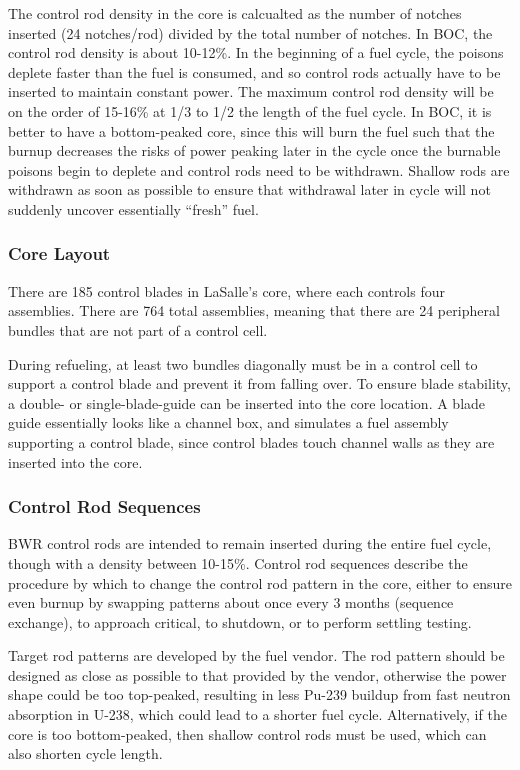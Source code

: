 \documentclass[10pt]{article}
\begin{document}
The control rod density in the core is calcualted as the number of notches inserted (24 notches/rod) divided by the total number of notches. In BOC, the control rod density is about 10-12\%. In the beginning of a fuel cycle, the poisons deplete faster than the fuel is consumed, and so control rods actually have to be inserted to maintain constant power. The maximum control rod density will be on the order of 15-16\% at 1/3 to 1/2 the length of the fuel cycle. In BOC, it is better to have a bottom-peaked core, since this will burn the fuel such that the burnup decreases the risks of power peaking later in the cycle once the burnable poisons begin to deplete and control rods need to be withdrawn. Shallow rods are withdrawn as soon as possible to ensure that withdrawal later in cycle will not suddenly uncover essentially “fresh” fuel. 

\subsubsection{Core Layout}

There are 185 control blades in LaSalle’s core, where each controls four assemblies. There are 764 total assemblies, meaning that there are 24 peripheral bundles that are not part of a control cell.

During refueling, at least two bundles diagonally must be in a control cell to support a control blade and prevent it from falling over. To ensure blade stability, a double- or single-blade-guide can be inserted into the core location. A blade guide essentially looks like a channel box, and simulates a fuel assembly supporting a control blade, since control blades touch channel walls as they are inserted into the core.

\subsubsection{Control Rod Sequences}

BWR control rods are intended to remain inserted during the entire fuel cycle, though with a density between 10-15\%. Control rod sequences describe the procedure by which to change the control rod pattern in the core, either to ensure even burnup by swapping patterns about once every 3 months (sequence exchange), to approach critical, to shutdown, or to perform settling testing. 

Target rod patterns are developed by the fuel vendor. The rod pattern should be designed as close as possible to that provided by the vendor, otherwise the power shape could be too top-peaked, resulting in less Pu-239 buildup from fast neutron absorption in U-238, which could lead to a shorter fuel cycle. Alternatively, if the core is too bottom-peaked, then shallow control rods must be used, which can also shorten cycle length. 
\end{document}
